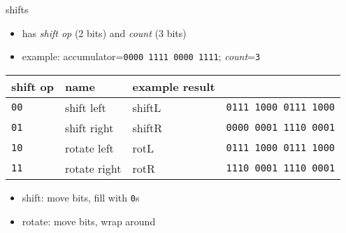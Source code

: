 \begin{frame}{shifts}
    \begin{itemize}
        \item has \textit{shift op} (2 bits) and \textit{count} (3 bits)
        \item example: accumulator={\tt \textcolor{s1}{0000} \textcolor{s2}{1111} \textcolor{s3}{0000} \textcolor{s4}{1111}}; \textit{count}={\tt 3}
    \end{itemize}
\begin{tabular}{l|l|l|l}
shift op & name & example result \\ \hline
\tt 00 & shift left & shiftL &  {\tt \textcolor{s1}{0}\textcolor{s2}{111 1}\textcolor{s3}{000 0}\textcolor{s4}{111 1}\textcolor{s0}{000}} \\
\tt 01 & shift right& shiftR & {\tt \textcolor{s0}{000}\textcolor{s1}{0 000}\textcolor{s2}{1 111}\textcolor{s3}{0 000}\textcolor{s4}{1}} \\
\tt 10 & rotate left & rotL & {\tt \textcolor{s1}{0}\textcolor{s2}{111 1}\textcolor{s3}{000 0}\textcolor{s4}{111 1}\textcolor{s1}{000}} \\
\tt 11 & rotate right& rotR & {\tt \textcolor{s4}{111}\textcolor{s1}{0 000}\textcolor{s2}{1 111}\textcolor{s3}{0 000}\textcolor{s4}{1}} \\
\end{tabular}
    \begin{itemize}
    \item shift: move bits, fill with {\tt 0}s
    \item rotate: move bits, wrap around
    \end{itemize}
\end{frame}

